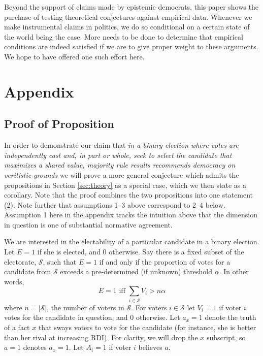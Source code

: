 \documentclass[11pt]{article}
\begin{document}
Beyond the support of claims made by epistemic democrats, this paper shows the purchase of testing theoretical conjectures against empirical data. Whenever we make instrumental claims in politics, we do so conditional on a certain state of the world being the case. More needs to be done to determine that empirical conditions are indeed satisfied if we are to give proper weight to these arguments. We hope to have offered one such effort here.



\section{Appendix}
\subsection{Proof of Proposition}


In order to demonstrate our claim that \emph{in a binary election where votes are independently cast and, in part or whole, seek to select the candidate that maximizes a shared value, majority rule results recommends democracy on veritistic grounds}
we will prove a more general conjecture which admits the propositions in Section \ref{sec:theory} as a special case, which we then state as a corollary. Note that the proof combines the two propositions into one statement (2). Note further that assumptions 1--3 above correspond to 2--4 below. Assumption 1 here in the appendix tracks the intuition above that the dimension in question is one of substantial normative agreement. 

We are interested in the electability of a particular candidate in a binary election. Let $E=1$ if she is elected, and 0 otherwise.
Say there is a fixed subset of the electorate, $\mathcal{S}$, such that $E=1$ if and only if the proportion of votes for a candidate from $\mathcal{S}$ exceeds a pre-determined (if unknown) threshold $\alpha$. In other words,
\begin{equation}
E =1 \text{ iff } \sum_{i\in \mathcal{S}} V_i>n\alpha
\end{equation}
where $n=|\mathcal{S}|$, the number of voters in $\mathcal{S}$.
For voters $i\in \mathcal{S}$ let $V_i=1$ if voter $i$ votes for the candidate in question, and 0 otherwise.
Let $a_x=1$ denote the truth of a fact $x$ that sways voters to vote for the candidate (for instance, she is better than her rival at increasing RDI).
For clarity, we will drop the $x$ subscript, so $a=1$ denotes $a_x=1$.
Let $A_i=1$ if voter $i$ believes $a$.
\end{document}
